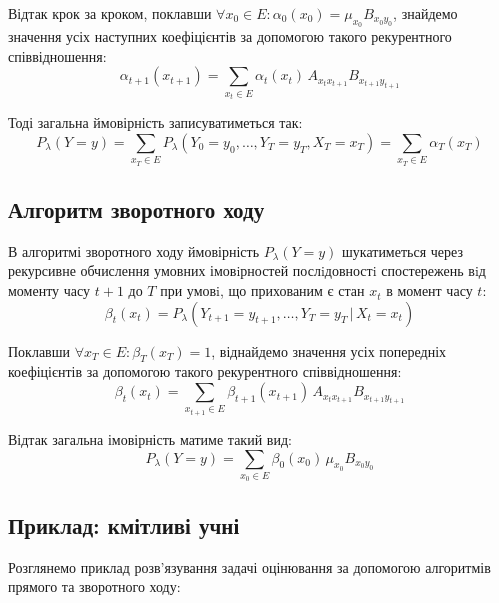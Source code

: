 Відтак крок за кроком, поклавши $\forall x_0 \in E: \alpha_0(x_0)=\mu_{x_0}B_{x_0 y_0}$, знайдемо значення усіх наступних коефіцієнтів за допомогою такого рекурентного співвідношення:
\begin{equation*}
    \alpha_{t+1}(x_{t+1})=\sum\limits_{x_t\in E}\alpha_t(x_t)\, A_{x_t x_{t+1}}B_{x_{t+1}y_{t+1}} 
\end{equation*}

Тоді загальна ймовірність записуватиметься так:
\begin{equation*}
    P_\lambda(Y = y)=\sum\limits_{x_T \in E}P_\lambda(Y_0=y_0,\ldots,Y_T=y_T,X_T=x_T)=\sum\limits_{x_T \in E}\alpha_T(x_T)
\end{equation*}

\subsection{Алгоритм зворотного ходу}

В алгоритмі зворотного ходу ймовірність $P_\lambda(Y = y)$ шукатиметься через рекурсивне обчислення умовних імовiрностей послiдовностi спостережень вiд моменту часу $t + 1$ до $T$ при умовi, що прихованим є стан $x_t$ в момент часу $t:$
\begin{equation}
    \beta_t(x_t)=P_\lambda(Y_{t+1}=y_{t+1},\ldots,Y_T=y_T \, | \, X_t=x_t) \label{formula: beta}
\end{equation}

Поклавши $\forall x_T \in E: \beta_T(x_T)=1$, віднайдемо значення усіх попередніх коефіцієнтів за допомогою такого рекурентного співвідношення:
\begin{equation*}
    \beta_t(x_t)=\sum\limits_{x_{t+1}\in E}\beta_{t+1}(x_{t+1})\, A_{x_t x_{t+1}}B_{x_{t+1}y_{t+1}} 
\end{equation*}

Відтак загальна імовірність матиме такий вид:
\begin{equation*}
    P_\lambda(Y = y)=\sum\limits_{x_0 \in E}\beta_0(x_0)\, \mu_{x_0}B_{x_0 y_0}
\end{equation*}

\subsection{Приклад: кмітливі учні}

Розглянемо приклад розв'язування задачі оцінювання за допомогою алгоритмів прямого та зворотного ходу:

